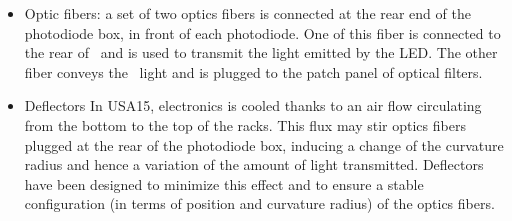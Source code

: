\begin{itemize}
\item Optic fibers: a set of two optics fibers is connected at the rear end of the photodiode box, in front of each photodiode. One of this fiber is connected to the rear of \phocal~and is used to transmit the light emitted by the LED. The other fiber conveys the \laser~light and is plugged to the patch panel of optical filters. 
\item Deflectors
In USA15, electronics is cooled thanks to an air flow circulating from the bottom to the top of the racks. This flux may stir optics fibers plugged at the rear of the photodiode box, inducing a change of the curvature radius and hence a variation of the amount of light transmitted. Deflectors have been designed to minimize this effect and to ensure a stable configuration (in terms of position and curvature radius) of the optics fibers.
\end{itemize}


